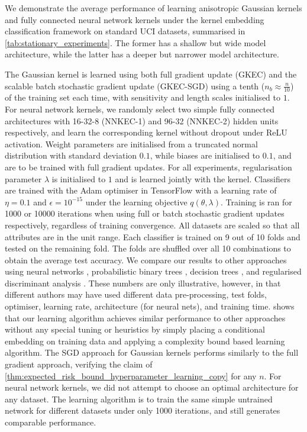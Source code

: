 \documentclass{article}
\begin{document}
		We demonstrate the average performance of learning anisotropic Gaussian kernels and fully connected neural network kernels under the kernel embedding classification framework on standard UCI datasets, summarised in \cref{tab:stationary_experiments}. The former has a shallow but wide model architecture, while the latter has a deeper but narrower model architecture.
		
		The Gaussian kernel is learned using both full gradient update (GKEC) and the scalable batch stochastic gradient update (GKEC-SGD) using a tenth ($n_{b} \approx \frac{n}{10}$) of the training set each time, with sensitivity and length scales initialised to $1$. For neural network kernels, we randomly select two simple fully connected architectures with 16-32-8 (NNKEC-1) and 96-32 (NNKEC-2) hidden units respectively, and learn the corresponding kernel without dropout under ReLU activation. Weight parameters are initialised from a truncated normal distribution with standard deviation $0.1$, while biases are initialised to $0.1$, and are to be trained with full gradient updates. For all experiments, regularisation parameter $\lambda$ is initialised to $1$ and is learned jointly with the kernel. Classifiers are trained with the Adam optimiser \citep{kingma2014adam} in TensorFlow \citep{abadi2016tensorflow} with a learning rate of $\eta = 0.1$ and $\epsilon = 10^{-15}$ under the learning objective $q(\theta, \lambda)$. Training is ran for 1000 or 10000 iterations when using full or batch stochastic gradient updates respectively, regardless of training convergence. All datasets are scaled so that all attributes are in the unit range. Each classifier is trained on 9 out of 10 folds and tested on the remaining fold. The folds are shuffled over all 10 combinations to obtain the average test accuracy. We compare our results to other approaches using neural networks \citep[a; c]{kaya2016banknote, freire2009short}, probabilistic binary trees \citep[b]{horton1996probabilistic}, decision trees \citep[d]{zhou2004size}, and regularised discriminant analysis \citep[e]{aeberhard1992comparison}. These numbers are only illustrative, however, in that different authors may have used different data pre-processing, test folds, optimiser, learning rate, architecture (for neural nets), and training time.  shows that our learning algorithm achieves similar performance to other approaches without any special tuning or heuristics by simply placing a conditional embedding on training data and applying a complexity bound based learning algorithm. The SGD approach for Gaussian kernels performs similarly to the full gradient approach, verifying the claim of \cref{thm:expected_risk_bound_hyperparameter_learning_copy} for any $n$. For neural network kernels, we did not attempt to choose an optimal architecture for any dataset. The learning algorithm is to train the same simple untrained network for different datasets under only 1000 iterations, and still generates comparable performance. 
	
\end{document}
